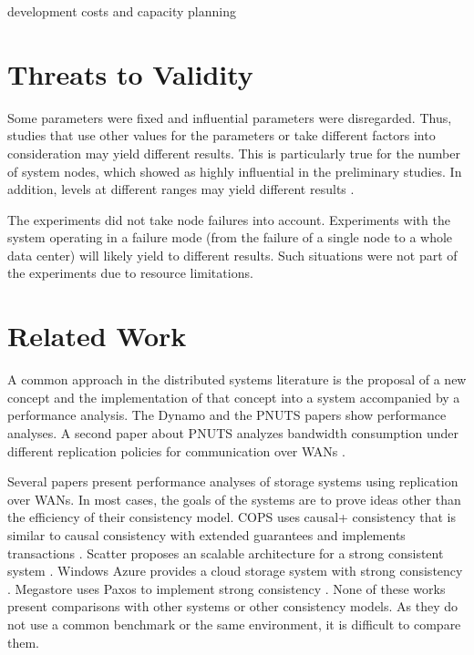 \documentclass[doublespacing]{bmcart}
\begin{document}
development costs and capacity planning

\section{Threats to Validity}

Some parameters were fixed and influential parameters were disregarded. Thus,
studies that use other values for the parameters or take different factors into
consideration may yield different results. This is particularly true for the
number of system nodes, which showed as highly influential in the preliminary
studies. In addition, levels at different ranges may yield different results
\cite{Jain1991}.

The experiments did not take node failures into account. Experiments with the
system operating in a failure mode (from the failure of a single node to a
whole data center) will likely yield to different results. Such situations were
not part of the experiments due to resource limitations.

\section{Related Work}

A common approach in the distributed systems literature is the proposal of a
new concept and the implementation of that concept into a system accompanied by
a performance analysis. The Dynamo \cite{DeCandia2007} and the PNUTS papers
\cite{Cooper2008} show performance analyses. A second paper about PNUTS
analyzes bandwidth consumption under different replication policies for
communication over WANs \cite{Kadambi2011}.

Several papers present performance analyses of storage systems using
replication over WANs. In most cases, the goals of the systems are to prove
ideas other than the efficiency of their consistency model. COPS uses causal+
consistency that is similar to causal consistency with extended guarantees and
implements transactions \cite{Lloyd2011}. Scatter proposes an scalable
architecture for a strong consistent system \cite{Glendenning2011}. Windows
Azure provides a cloud storage system with strong consistency
\cite{Calder2011}. Megastore uses Paxos to implement strong consistency
\cite{Baker2011}. None of these works present comparisons with other systems or
other consistency models. As they do not use a common benchmark or the same
environment, it is difficult to compare them.
\end{document}
